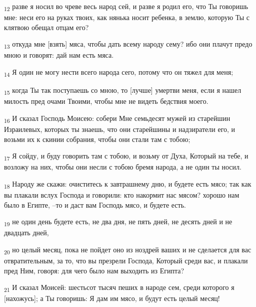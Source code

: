 \begin{tcolorbox}
\textsubscript{12} разве я носил во чреве весь народ сей, и разве я родил его, что Ты говоришь мне: неси его на руках твоих, как нянька носит ребенка, в землю, которую Ты с клятвою обещал отцам его?
\end{tcolorbox}
\begin{tcolorbox}
\textsubscript{13} откуда мне [взять] мяса, чтобы дать всему народу сему? ибо они плачут предо мною и говорят: дай нам есть мяса.
\end{tcolorbox}
\begin{tcolorbox}
\textsubscript{14} Я один не могу нести всего народа сего, потому что он тяжел для меня;
\end{tcolorbox}
\begin{tcolorbox}
\textsubscript{15} когда Ты так поступаешь со мною, то [лучше] умертви меня, если я нашел милость пред очами Твоими, чтобы мне не видеть бедствия моего.
\end{tcolorbox}
\begin{tcolorbox}
\textsubscript{16} И сказал Господь Моисею: собери Мне семьдесят мужей из старейшин Израилевых, которых ты знаешь, что они старейшины и надзиратели его, и возьми их к скинии собрания, чтобы они стали там с тобою;
\end{tcolorbox}
\begin{tcolorbox}
\textsubscript{17} Я сойду, и буду говорить там с тобою, и возьму от Духа, Который на тебе, и возложу на них, чтобы они несли с тобою бремя народа, а не один ты носил.
\end{tcolorbox}
\begin{tcolorbox}
\textsubscript{18} Народу же скажи: очиститесь к завтрашнему дню, и будете есть мясо; так как вы плакали вслух Господа и говорили: кто накормит нас мясом? хорошо нам было в Египте, --то и даст вам Господь мясо, и будете есть.
\end{tcolorbox}
\begin{tcolorbox}
\textsubscript{19} не один день будете есть, не два дня, не пять дней, не десять дней и не двадцать дней,
\end{tcolorbox}
\begin{tcolorbox}
\textsubscript{20} но целый месяц, пока не пойдет оно из ноздрей ваших и не сделается для вас отвратительным, за то, что вы презрели Господа, Который среди вас, и плакали пред Ним, говоря: для чего было нам выходить из Египта?
\end{tcolorbox}
\begin{tcolorbox}
\textsubscript{21} И сказал Моисей: шестьсот тысяч пеших в народе сем, среди которого я [нахожусь]; а Ты говоришь: Я дам им мясо, и будут есть целый месяц!
\end{tcolorbox}
